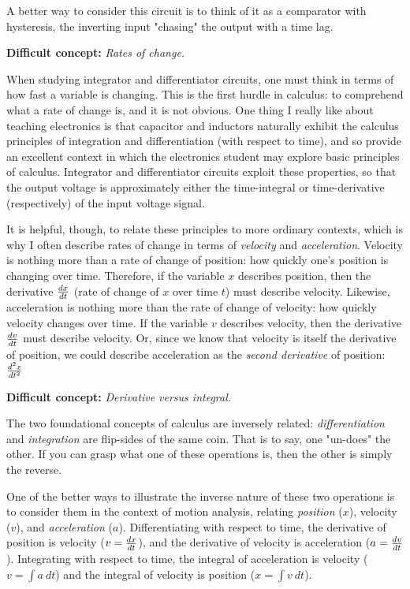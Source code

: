A better way to consider this circuit is to think of it as a comparator with hysteresis, the inverting input "chasing" the output with a time lag.

\vskip 10pt

\noindent
{\bf Difficult concept: } {\it Rates of change.}

When studying integrator and differentiator circuits, one must think in terms of how fast a variable is changing.  This is the first hurdle in calculus: to comprehend what a rate of change is, and it is not obvious.  One thing I really like about teaching electronics is that capacitor and inductors naturally exhibit the calculus principles of integration and differentiation (with respect to time), and so provide an excellent context in which the electronics student may explore basic principles of calculus.  Integrator and differentiator circuits exploit these properties, so that the output voltage is approximately either the time-integral or time-derivative (respectively) of the input voltage signal.

It is helpful, though, to relate these principles to more ordinary contexts, which is why I often describe rates of change in terms of {\it velocity} and {\it acceleration}.  Velocity is nothing more than a rate of change of position: how quickly one's position is changing over time.  Therefore, if the variable $x$ describes position, then the derivative ${dx \over dt}$ (rate of change of $x$ over time $t$) must describe velocity.  Likewise, acceleration is nothing more than the rate of change of velocity: how quickly velocity changes over time.  If the variable $v$ describes velocity, then the derivative ${dv \over dt}$ must describe velocity.  Or, since we know that velocity is itself the derivative of position, we could describe acceleration as the {\it second derivative} of position: ${d^2 x \over dt^2}$

\vskip 10pt

\noindent
{\bf Difficult concept: } {\it Derivative versus integral.}

The two foundational concepts of calculus are inversely related: {\it differentiation} and {\it integration} are flip-sides of the same coin.  That is to say, one "un-does" the other.  If you can grasp what one of these operations is, then the other is simply the reverse.

One of the better ways to illustrate the inverse nature of these two operations is to consider them in the context of motion analysis, relating {\it position} ($x$), velocity ($v$), and {\it acceleration} ($a$).  Differentiating with respect to time, the derivative of position is velocity ($v = {dx \over dt}$), and the derivative of velocity is acceleration ($a = {dv \over dt}$).  Integrating with respect to time, the integral of acceleration is velocity ($v = \int a \> dt$) and the integral of velocity is position ($x = \int v \> dt$).

